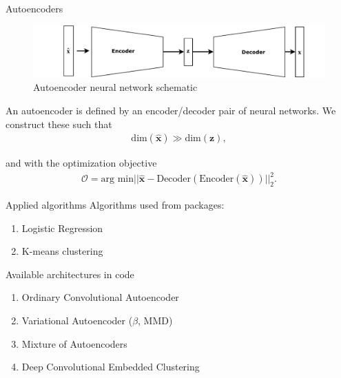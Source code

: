 \documentclass[notes]{beamer}
\begin{document}
\begin{frame}[t]{Autoencoders}
	\begin{figure}[h]
		\centering
		\includegraphics[width=0.8\linewidth]{../chapters/theory/autoencoder/plots/autoencoder.pdf}
		\caption{Autoencoder neural network schematic}%
		\label{fig:autoenc}
	\end{figure}

	An autoencoder is defined by an encoder/decoder pair of neural networks. We construct these such that 
	\begin{align}
		\text{dim}(\mathbf{\hat{x}}) \gg \text{dim}(\mathbf{z}),
	\end{align}

	and with the optimization objective
	\begin{align}
		\mathcal{O} = \text{arg min} || \mathbf{\hat{x}} - \text{Decoder}(\text{Encoder}(\mathbf{\hat{x}}))||_2 ^2.
	\end{align}
\end{frame}

\begin{frame}[t]{Applied algorithms}
	Algorithms used from packages:
	\begin{enumerate}[I]
		\item Logistic Regression
		\item K-means clustering
	\end{enumerate}
	Available architectures in code
	\begin{enumerate}[I]
		\item Ordinary Convolutional Autoencoder
		\item Variational Autoencoder ($\beta$, MMD)
		\item Mixture of Autoencoders 
		\item Deep Convolutional Embedded Clustering
	\end{enumerate}
\end{frame}
\end{document}
